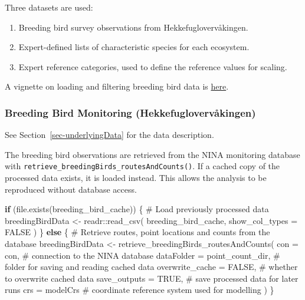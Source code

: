 \documentclass[
  letterpaper,
  DIV=11,
  numbers=noendperiod]{scrartcl}
\newenvironment{Shaded}{\begin{snugshade}}{\end{snugshade}}
\newcommand{\AttributeTok}[1]{\textcolor[rgb]{0.40,0.45,0.13}{#1}}
\newcommand{\CommentTok}[1]{\textcolor[rgb]{0.37,0.37,0.37}{#1}}
\newcommand{\ConstantTok}[1]{\textcolor[rgb]{0.56,0.35,0.01}{#1}}
\newcommand{\ControlFlowTok}[1]{\textcolor[rgb]{0.00,0.23,0.31}{\textbf{#1}}}
\newcommand{\FunctionTok}[1]{\textcolor[rgb]{0.28,0.35,0.67}{#1}}
\newcommand{\NormalTok}[1]{\textcolor[rgb]{0.00,0.23,0.31}{#1}}
\newcommand{\OtherTok}[1]{\textcolor[rgb]{0.00,0.23,0.31}{#1}}
\newcommand{\SpecialCharTok}[1]{\textcolor[rgb]{0.37,0.37,0.37}{#1}}
\providecommand{\tightlist}{%
  \setlength{\itemsep}{0pt}\setlength{\parskip}{0pt}}
\begin{document}
Three datasets are used:

\begin{enumerate}
\def\labelenumi{\arabic{enumi}.}
\tightlist
\item
  Breeding bird survey observations from Hekkefuglovervåkingen.
\item
  Expert-defined lists of characteristic species for each ecosystem.
\item
  Expert reference categories, used to define the reference values for
  scaling.
\end{enumerate}

A vignette on loading and filtering breeding bird data is
\href{https://github.com/NINAnor/breedingBirdIndicator_OccupancyModelling/blob/main/vignettes/data_preparation.qmd}{here}.

\subsubsection{Breeding Bird Monitoring
(Hekkefuglovervåkingen)}\label{breeding-bird-monitoring-hekkefuglovervuxe5kingen}

See Section~\ref{sec-underlyingData} for the data description.

The breeding bird observations are retrieved from the NINA monitoring
database with \texttt{retrieve\_breedingBirds\_routesAndCounts()}. If a
cached copy of the processed data exists, it is loaded instead. This
allows the analysis to be reproduced without database access.

\begin{Shaded}
\begin{Highlighting}[]
\ControlFlowTok{if}\NormalTok{ (}\FunctionTok{file.exists}\NormalTok{(breeding\_bird\_cache)) \{}
  \CommentTok{\# Load previously processed data}
\NormalTok{  breedingBirdData }\OtherTok{\textless{}{-}}\NormalTok{ readr}\SpecialCharTok{::}\FunctionTok{read\_csv}\NormalTok{(}
\NormalTok{    breeding\_bird\_cache,}
    \AttributeTok{show\_col\_types =} \ConstantTok{FALSE}
\NormalTok{  )}
\NormalTok{\} }\ControlFlowTok{else}\NormalTok{ \{}
  \CommentTok{\# Retrieve routes, point locations and counts from the database}
\NormalTok{  breedingBirdData }\OtherTok{\textless{}{-}} \FunctionTok{retrieve\_breedingBirds\_routesAndCounts}\NormalTok{(}
    \AttributeTok{con             =}\NormalTok{ con,             }\CommentTok{\# connection to the NINA database}
    \AttributeTok{dataFolder      =}\NormalTok{ point\_count\_dir, }\CommentTok{\# folder for saving and reading cached data}
    \AttributeTok{overwrite\_cache =} \ConstantTok{FALSE}\NormalTok{,           }\CommentTok{\# whether to overwrite cached data}
    \AttributeTok{save\_outputs    =} \ConstantTok{TRUE}\NormalTok{,            }\CommentTok{\# save processed data for later runs}
    \AttributeTok{crs             =}\NormalTok{ modelCrs         }\CommentTok{\# coordinate reference system used for modelling}
\NormalTok{  )}
\NormalTok{\}}
\end{Highlighting}
\end{Shaded}
\end{document}
